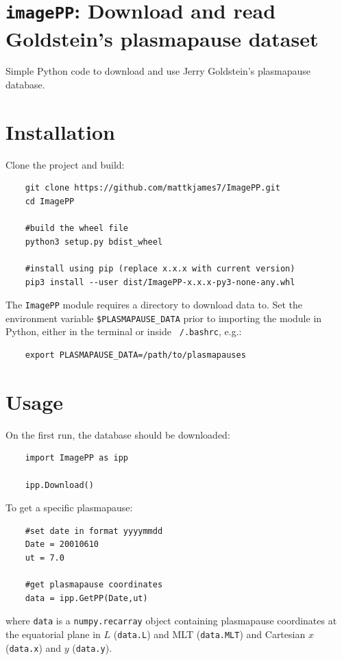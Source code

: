	\section{\texttt{imagePP}: Download and read Goldstein's plasmapause dataset}

	Simple Python code to download and use Jerry Goldstein's plasmapause database.

	\section{Installation}
	
	Clone the project and build:
	\begin{verbatim}
	git clone https://github.com/mattkjames7/ImagePP.git
	cd ImagePP
	
	#build the wheel file
	python3 setup.py bdist_wheel
	
	#install using pip (replace x.x.x with current version)
	pip3 install --user dist/ImagePP-x.x.x-py3-none-any.whl
	\end{verbatim}
	
	The \texttt{ImagePP} module requires a directory to download data to. Set the environment variable \texttt{\$PLASMAPAUSE\_DATA} prior to importing the module in Python, either in the terminal or inside \texttt{~/.bashrc}, e.g.:
	\begin{verbatim}
	export PLASMAPAUSE_DATA=/path/to/plasmapauses
	\end{verbatim}
	
	\section{Usage}
	
	On the first run, the database should be downloaded:
	\begin{verbatim}
	import ImagePP as ipp
	
	ipp.Download()
	\end{verbatim}
	
	To get a specific plasmapause:
	\begin{verbatim}
	#set date in format yyyymmdd
	Date = 20010610
	ut = 7.0
	
	#get plasmapause coordinates
	data = ipp.GetPP(Date,ut)
	\end{verbatim}
	
	where \texttt{data} is a \texttt{numpy.recarray} object containing plasmapause coordinates at the equatorial plane in $L$ (\texttt{data.L}) and MLT (\texttt{data.MLT}) and Cartesian $x$ (\texttt{data.x}) and $y$ (\texttt{data.y}).
	
